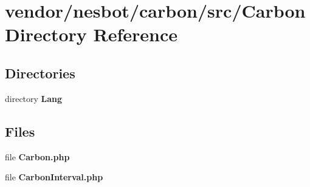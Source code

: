 \section{vendor/nesbot/carbon/src/\+Carbon Directory Reference}
\label{dir_db15c27b05f5ce632526740a9b7c936c}
\subsection*{Directories}
\begin{DoxyCompactItemize}
\item 
directory {\bf Lang}
\end{DoxyCompactItemize}
\subsection*{Files}
\begin{DoxyCompactItemize}
\item 
file {\bf Carbon.\+php}
\item 
file {\bf Carbon\+Interval.\+php}
\end{DoxyCompactItemize}
